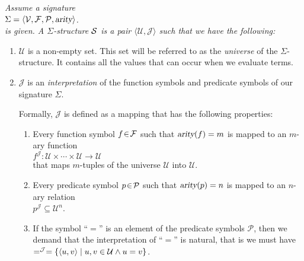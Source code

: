 \begin{Definition}
{\em
    Assume a signature \\[0.2cm]
    \hspace*{1.3cm} 
    $\Sigma = \langle \mathcal{V}, \mathcal{F}, \mathcal{P}, \textsl{arity} \rangle$. 
    \\[0.2cm]
    is given.  A  \emph{$\Sigma$-structure} $\mathcal{S}$ is a pair
    $\langle \mathcal{U}, \mathcal{J} \rangle$ such that we have the following:
    \begin{enumerate}
        \item $\mathcal{U}$ is a non-empty set.  This set will be referred to as the 
              \emph{universe} of the $\Sigma$-structure.  It contains all the values
              that can occur when we evaluate terms.
        \item $\mathcal{J}$ is an \emph{interpretation} of the function symbols and predicate
              symbols of our signature $\Sigma$.
              
              Formally,  $\mathcal{J}$ is defined as a mapping that has the following properties:
        \begin{enumerate}
        \item Every function symbol  $f \!\in\! \mathcal{F}$ such that $\textsl{arity}(f) = m$ is
              mapped to an  $m$-ary function
              \\[0.2cm]
              \hspace*{1.3cm}
              $f^\mathcal{J}\colon \mathcal{U} \times \cdots \times \mathcal{U} \rightarrow \mathcal{U}$ 
              \\[0.2cm]
              that maps  $m$-tuples of the universe  $\mathcal{U}$ into  $\mathcal{U}$.
        \item Every predicate symbol $p \!\in\! \mathcal{P}$ such that $\textsl{arity}(p) = n$ is mapped
              to an  $n$-ary relation \\[0.2cm]
              \hspace*{1.3cm} 
              $p^\mathcal{J} \subseteq \mathcal{U}^n$. 
        \item If the symbol  ``$=$'' is an element of the predicate symbols  $\mathcal{P}$, then
              we demand that the interpretation of ``$=$'' is natural, that is we must have
              \\[0.2cm]
              \hspace*{1.3cm}  
              $=^\mathcal{J} = \{ \pair(u,v) \mid u,v \in \mathcal{U} \wedge u = v\}$.
        \end{enumerate}
    \end{enumerate}
}
\end{Definition}

